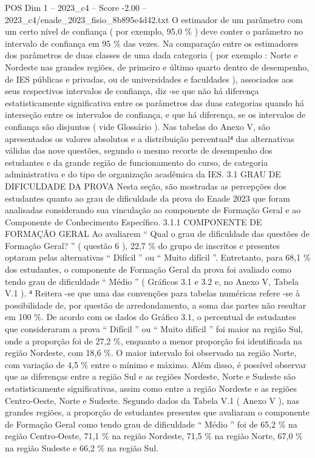 \begin{textsample}{POS Dim 1 – 2023\_c4 – Score -2.00 – 2023\_c4/enade\_2023\_fisio\_8b895e4d42.txt}
O estimador de um parâmetro com um certo nível de confiança ( por exemplo, 95,0 \% ) deve conter o parâmetro no intervalo de confiança em 95 \% das vezes.
Na comparação entre os estimadores dos parâmetros de duas classes de uma dada categoria ( por exemplo : Norte e Nordeste nas grandes regiões, de primeiro e último quarto dentro de desempenho, de IES públicas e privadas, ou de universidades e faculdades ), associados aos seus respectivos intervalos de confiança, diz -se que não há diferença estatisticamente significativa entre os parâmetros das duas categorias quando há interseção entre os intervalos de confiança, e que há diferença, se os intervalos de confiança são disjuntos ( vide Glossário ).
Nas tabelas do Anexo V, são apresentados os valores absolutos e a distribuição percentual⁴ das alternativas válidas das nove questões, segundo o mesmo recorte de desempenho dos estudantes e da grande região de funcionamento do curso, de categoria administrativa e do tipo de organização acadêmica da IES. 3.1 GRAU DE DIFICULDADE DA PROVA Nesta seção, são mostradas as percepções dos estudantes quanto ao grau de dificuldade da prova do Enade 2023 que foram analisadas considerando sua vinculação ao componente de Formação Geral e ao Componente de Conhecimento Específico. 3.1.1 COMPONENTE DE FORMAÇÃO GERAL Ao avaliarem “ Qual o grau de dificuldade das questões de Formação Geral? ” ( questão 6 ), 22,7 \% do grupo de inscritos e presentes optaram pelas alternativas “ Difícil ” ou “ Muito difícil ”.
Entretanto, para 68,1 \% dos estudantes, o componente de Formação Geral da prova foi avaliado como tendo grau de dificuldade “ Médio ” ( Gráficos 3.1 e 3.2 e, no Anexo V, Tabela V.1 ). ⁴ Reitera -se que uma das convenções para tabelas numéricas refere -se à possibilidade de, por questão de arredondamento, a soma das partes não resultar em 100 \%.
De acordo com os dados do Gráfico 3.1, o percentual de estudantes que consideraram a prova “ Difícil ” ou “ Muito difícil ” foi maior na região Sul, onde a proporção foi de 27,2 \%, enquanto a menor proporção foi identificada na região Nordeste, com 18,6 \%.
O maior intervalo foi observado na região Norte, com variação de 4,5 \% entre o mínimo e máximo.
Além disso, é possível observar que as diferenças entre a região Sul e as regiões Nordeste, Norte e Sudeste são estatisticamente significativas, assim como entre a região Nordeste e as regiões Centro-Oeste, Norte e Sudeste.
Segundo dados da Tabela V.1 ( Anexo V ), nas grandes regiões, a proporção de estudantes presentes que avaliaram o componente de Formação Geral como tendo grau de dificuldade “ Médio ” foi de 65,2 \% na região Centro-Oeste, 71,1 \% na região Nordeste, 71,5 \% na região Norte, 67,0 \% na região Sudeste e 66,2 \% na região Sul.

\end{textsample}
